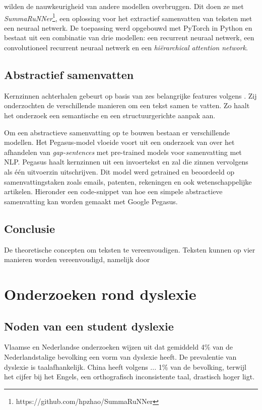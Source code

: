 \textcite{Nallapati2017} wilden de nauwkeurigheid van andere modellen overbruggen. Dit doen ze met \textit{SummaRuNNer}\footnote{https://github.com/hpzhao/SummaRuNNer}, een oplossing voor het extractief samenvatten van teksten met een neuraal netwerk. De toepassing werd opgebouwd met PyTorch in Python en bestaat uit een combinatie van drie modellen: een recurrent neuraal netwerk, een convolutioneel recurrent neuraal netwerk en een \textit{hiërarchical attention network}.

\subsection{Abstractief samenvatten}

Kernzinnen achterhalen gebeurt op basis van zes belangrijke features volgens \textcite{Khan2014}. Zij onderzochten de verschillende manieren om een tekst samen te vatten. Zo haalt het onderzoek een semantische en een structuurgerichte aanpak aan.

Om een abstractieve samenvatting op te bouwen bestaan er verschillende modellen. Het Pegasus-model vloeide voort uit een onderzoek van \textcite{Zhang2020} over het afhandelen van \textit{gap-sentences} met pre-trained models voor samenvatting met NLP. Pegasus haalt kernzinnen uit een invoertekst en zal die zinnen vervolgens als één uitvoerzin uitschrijven. Dit model werd getrained en beoordeeld op samenvattingstaken zoals emails, patenten, rekeningen en ook wetenschappelijke artikelen. Hieronder een code-snippet van hoe een simpele abstractieve samenvatting kan worden gemaakt met Google Pegasus.

\subsection{Conclusie}

De theoretische concepten om teksten te vereenvoudigen. Teksten kunnen op vier manieren worden vereenvoudigd, namelijk door 

\section{Onderzoeken rond dyslexie}

\subsection{Noden van een student dyslexie}

Vlaamse en Nederlandse onderzoeken wijzen uit dat gemiddeld 4\% van de Nederlandstalige bevolking een vorm van dyslexie heeft. De prevalentie van dyslexie is taalafhankelijk. China heeft volgens ... 1\% van de bevolking, terwijl het cijfer bij het Engels, een orthografisch inconsistente taal, drastisch hoger ligt. 


